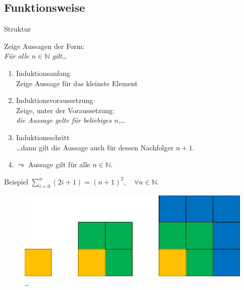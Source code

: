 \subsection{Funktionsweise}
\begin{frame}[fragile]{Struktur}
    \begin{alertblock}{Zeige Aussagen der Form:\\\emph{Für alle $n\in\mathbb{N}$ gilt\ldots}}
        \begin{enumerate}
            \item \alert{Induktionsanfang}\\Zeige Aussage für das kleinste Element
            \item \alert{Induktionsvoraussetzung}\\Zeige, unter der Voraussetzung: \\\emph{die Aussage gelte für beliebiges $n$},\dots
            \item \alert{Induktionsschritt}\\\dots dann gilt die Aussage auch für dessen Nachfolger $n+1$.
            \item $\leadsto$ Aussage gilt für alle $n \in \mathbb{N}$.
        \end{enumerate}
    \end{alertblock}
\end{frame}

\begin{frame}[fragile]{Beispiel}
    \center $\displaystyle\sum_{i = 0}^{n} (2i+1) = (n+1)^2,\quad\forall n \in\mathbb{N}$.
    \begin{figure}
        \centering
        \includegraphics[width=0.5\textheight]{../figures/Summe.png}\qquad \dots
    \end{figure}
\end{frame}

